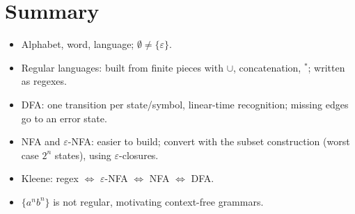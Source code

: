 \section{Summary}
\begin{itemize}
  \item Alphabet, word, language; $\emptyset \ne \{\varepsilon\}$.
  \item Regular languages: built from finite pieces with $\cup$, concatenation, $^*$; written as regexes.
  \item DFA: one transition per state/symbol, linear-time recognition; missing edges go to an error state.
  \item NFA and $\varepsilon$-NFA: easier to build; convert with the subset construction
        (worst case $2^n$ states), using $\varepsilon$-closures.
  \item Kleene: regex $\Leftrightarrow$ $\varepsilon$-NFA $\Leftrightarrow$ NFA $\Leftrightarrow$ DFA.
  \item $\{a^nb^n\}$ is not regular, motivating context-free grammars.
\end{itemize}
